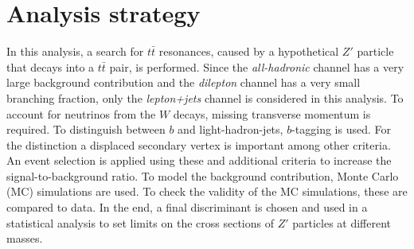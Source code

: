 \section{Analysis strategy}
\label{sec:Durchführung}
In this analysis, a search for $t\bar{t}$ resonances, caused by a hypothetical $Z\prime$ particle that decays into a $t\bar{t}$ pair, is performed. Since the \textit{all-hadronic} channel has a very large background contribution and the \textit{dilepton} channel has a very small branching fraction, only the \textit{lepton+jets} channel is considered in this analysis.
To account for neutrinos from the $W$ decays, missing transverse momentum is required. To distinguish between $b$ and light-hadron-jets,
$b$-tagging is used. For the distinction a displaced secondary vertex is important among other criteria.
An event selection is applied using these and additional criteria to increase the signal-to-background ratio.
To model the background contribution, Monte Carlo (MC) simulations are used.
To check the validity of the MC simulations, these are compared to data. In the end, a final discriminant is chosen and used in a statistical analysis to set limits on the cross sections of $Z\prime$ particles at different masses.
